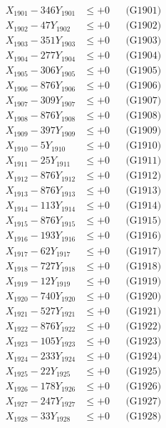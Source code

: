 \documentclass[a4paper,10pt]{article}
\begin{document}
{\begin{align}
\allowbreak
X_{1901} - 346Y_{1901} &\leq +0 && \text{(G1901)} \\
X_{1902} - 47Y_{1902} &\leq +0 && \text{(G1902)} \\
X_{1903} - 351Y_{1903} &\leq +0 && \text{(G1903)} \\
X_{1904} - 277Y_{1904} &\leq +0 && \text{(G1904)} \\
X_{1905} - 306Y_{1905} &\leq +0 && \text{(G1905)} \\
X_{1906} - 876Y_{1906} &\leq +0 && \text{(G1906)} \\
X_{1907} - 309Y_{1907} &\leq +0 && \text{(G1907)} \\
X_{1908} - 876Y_{1908} &\leq +0 && \text{(G1908)} \\
X_{1909} - 397Y_{1909} &\leq +0 && \text{(G1909)} \\
X_{1910} - 5Y_{1910} &\leq +0 && \text{(G1910)} \\
\allowbreak
X_{1911} - 25Y_{1911} &\leq +0 && \text{(G1911)} \\
X_{1912} - 876Y_{1912} &\leq +0 && \text{(G1912)} \\
X_{1913} - 876Y_{1913} &\leq +0 && \text{(G1913)} \\
X_{1914} - 113Y_{1914} &\leq +0 && \text{(G1914)} \\
X_{1915} - 876Y_{1915} &\leq +0 && \text{(G1915)} \\
X_{1916} - 193Y_{1916} &\leq +0 && \text{(G1916)} \\
X_{1917} - 62Y_{1917} &\leq +0 && \text{(G1917)} \\
X_{1918} - 727Y_{1918} &\leq +0 && \text{(G1918)} \\
X_{1919} - 12Y_{1919} &\leq +0 && \text{(G1919)} \\
X_{1920} - 740Y_{1920} &\leq +0 && \text{(G1920)} \\
\allowbreak
X_{1921} - 527Y_{1921} &\leq +0 && \text{(G1921)} \\
X_{1922} - 876Y_{1922} &\leq +0 && \text{(G1922)} \\
X_{1923} - 105Y_{1923} &\leq +0 && \text{(G1923)} \\
X_{1924} - 233Y_{1924} &\leq +0 && \text{(G1924)} \\
X_{1925} - 22Y_{1925} &\leq +0 && \text{(G1925)} \\
X_{1926} - 178Y_{1926} &\leq +0 && \text{(G1926)} \\
X_{1927} - 247Y_{1927} &\leq +0 && \text{(G1927)} \\
X_{1928} - 33Y_{1928} &\leq +0 && \text{(G1928)} \\

\end{align}}
\end{document}
